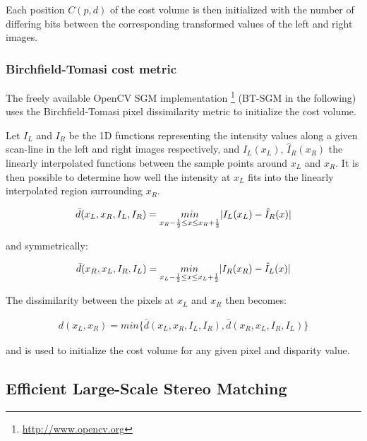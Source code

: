 Each position $C(p, d)$ of the cost volume is then initialized with the number of differing bits between the corresponding transformed values of the left and right images.

\subsubsection{Birchfield-Tomasi cost metric}\label{ch:chapter03_03_01_02}

The freely available OpenCV SGM implementation \footnote{\url{http://www.opencv.org}} (BT-SGM in the following) uses the Birchfield-Tomasi pixel dissimilarity metric \cite{Birchfield1998} to initialize the cost volume.

Let $I_L$ and $I_R$ be the 1D functions representing the intensity values along a given scan-line in the left and right images respectively, and $\hat{I}_L(x_L)$, $\hat{I}_R(x_R)$ the linearly interpolated functions between the sample points around $x_L$ and $x_R$. It is then possible to determine how well the intensity at $x_L$ fits into the linearly interpolated region surrounding $x_R$.

\begin{align}\label{eq:cp03_birchfield_tomasi_l_in_r}
\bar{d}(x_L, x_R, I_L, I_R) = \underset{x_R - {1 \over 2} \leq x \leq x_R + {1 \over 2}}{min} | I_L(x_L) - \hat{I}_R(x)|
\end{align}

and symmetrically:

\begin{align}\label{eq:cp03_birchfield_tomasi_r_in_l}
\bar{d}(x_R, x_L, I_R, I_L) = \underset{x_L - {1 \over 2} \leq x \leq x_L + {1 \over 2}}{min} | I_R(x_R) - \hat{I}_L(x)|
\end{align}

The dissimilarity between the pixels at $x_L$ and $x_R$ then becomes:

\begin{align}\label{eq:cp03_birchfield_tomasi}
d(x_L, x_R) = min \{ \bar{d}(x_L, x_R, I_L, I_R), \bar{d}(x_R, x_L, I_R, I_L) \}
\end{align}

and is used to initialize the cost volume for any given pixel and disparity value.


\subsection{Efficient Large-Scale Stereo Matching}\label{ch:chapter03_03_02}

